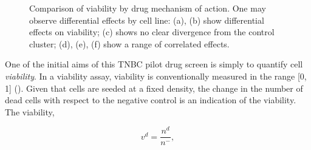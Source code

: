 \begin{figure}
    \qquad
    \qquad
\caption{Comparison of viability by drug mechanism of action. One may observe differential effects by cell line: (a), (b) show differential effects on viability; (c) shows no clear divergence from the control cluster; (d), (e), (f) show a range of correlated effects.}
\label{fig:viability_moas}
\end{figure}

One of the initial aims of this TNBC pilot drug screen is simply to quantify cell \emph{viability}. In a viability assay, viability is conventionally measured in the range [0, 1] (\cite{pegg1989viability}). Given that cells are seeded at a fixed density, the change in the number of dead cells with respect to the negative control is an indication of the viability. The viability,

\begin{equation}
v^d = \frac{n^d}{n^-},
\end{equation}

